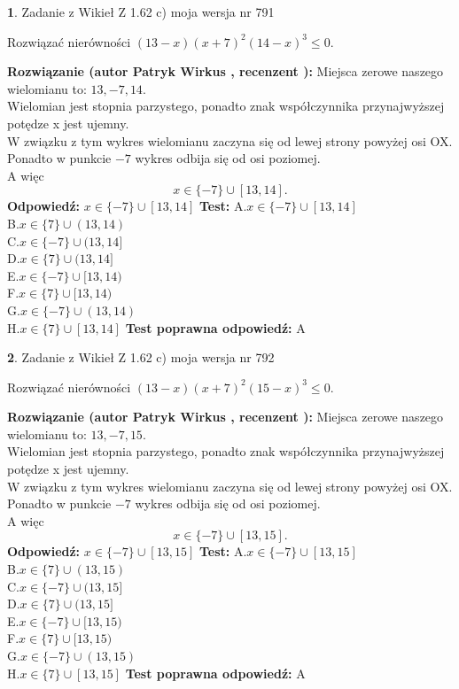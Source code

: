 \documentclass[12pt, a4paper]{article}
\theoremstyle{definition} %
\newtheorem{zad}{}
\newcommand{\zadStart}[1]{\begin{zad}#1\newline}
\newcommand{\zadStop}{\end{zad}}
\newcommand{\rozwStart}[2]{\noindent \textbf{Rozwiązanie (autor #1 , recenzent #2): }\newline}
\newcommand{\rozwStop}{\newline}
\newcommand{\odpStart}{\noindent \textbf{Odpowiedź:}\newline}
\newcommand{\odpStop}{\newline}
\newcommand{\testStart}{\noindent \textbf{Test:}\newline}
\newcommand{\testStop}{\newline}
\newcommand{\kluczStart}{\noindent \textbf{Test poprawna odpowiedź:}\newline}
\newcommand{\kluczStop}{\newline}
\begin{document}
\zadStart{Zadanie z Wikieł Z 1.62 c) moja wersja nr 791}

Rozwiązać nierówności $(13-x)(x+7)^{2}(14-x)^{3}\le0$.
\zadStop
\rozwStart{Patryk Wirkus}{}
Miejsca zerowe naszego wielomianu to: $13, -7, 14$.\\
Wielomian jest stopnia parzystego, ponadto znak współczynnika przy\linebreak najwyższej potędze x jest ujemny.\\ W związku z tym wykres wielomianu zaczyna się od lewej strony powyżej osi OX.\\
Ponadto w punkcie $-7$ wykres odbija się od osi poziomej.\\
A więc $$x \in \{-7\} \cup [13,14].$$
\rozwStop
\odpStart
$x \in \{-7\} \cup [13,14]$
\odpStop
\testStart
A.$x \in \{-7\} \cup [13,14]$\\
B.$x \in \{7\} \cup (13,14)$\\
C.$x \in \{-7\} \cup (13,14]$\\
D.$x \in \{7\} \cup (13,14]$\\
E.$x \in \{-7\} \cup [13,14)$\\
F.$x \in \{7\} \cup [13,14)$\\
G.$x \in \{-7\} \cup (13,14)$\\
H.$x \in \{7\} \cup [13,14]$
\testStop
\kluczStart
A
\kluczStop



\zadStart{Zadanie z Wikieł Z 1.62 c) moja wersja nr 792}

Rozwiązać nierówności $(13-x)(x+7)^{2}(15-x)^{3}\le0$.
\zadStop
\rozwStart{Patryk Wirkus}{}
Miejsca zerowe naszego wielomianu to: $13, -7, 15$.\\
Wielomian jest stopnia parzystego, ponadto znak współczynnika przy\linebreak najwyższej potędze x jest ujemny.\\ W związku z tym wykres wielomianu zaczyna się od lewej strony powyżej osi OX.\\
Ponadto w punkcie $-7$ wykres odbija się od osi poziomej.\\
A więc $$x \in \{-7\} \cup [13,15].$$
\rozwStop
\odpStart
$x \in \{-7\} \cup [13,15]$
\odpStop
\testStart
A.$x \in \{-7\} \cup [13,15]$\\
B.$x \in \{7\} \cup (13,15)$\\
C.$x \in \{-7\} \cup (13,15]$\\
D.$x \in \{7\} \cup (13,15]$\\
E.$x \in \{-7\} \cup [13,15)$\\
F.$x \in \{7\} \cup [13,15)$\\
G.$x \in \{-7\} \cup (13,15)$\\
H.$x \in \{7\} \cup [13,15]$
\testStop
\kluczStart
A
\kluczStop
\end{document}
